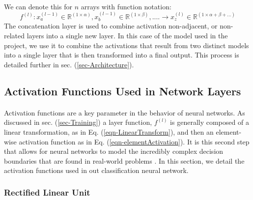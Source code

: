 \documentclass[12pt,letterpaper]{article}
\begin{document}
\paragraph*{}We can denote this for $n$ arrays with function notation:
\begin{equation}
\label{eqn-ConcatenationFunction}
f^{(l)} : x^{(l-1)}_{a} \in \mathbb{R}^{(1 \times \alpha)} , x^{(l-1)}_{b} \in \mathbb{R}^{(1 \times \beta)} , ....  \rightarrow
x^{(l)}_{z} \in \mathbb{R}^{(1 \times \alpha + \beta + ...)}
\end{equation}
The concatenation layer is used to combine activation non-adjacent, or non-related layers into a single new layer. In this case of the model used in the project, we use it to combine the activations that result from two distinct models into a single layer that is then transformed into a final output. This process is detailed further in sec. (\ref{sec-Architecture}).


\subsection{Activation Functions Used in Network Layers}
\label{sec-ActivationFunctions}

\paragraph*{}Activation functions are a key parameter in the behavior of neural networks. As discussed in sec. (\ref{sec-Training}) a layer function, $f^{(l)}$ is generally composed of a linear transformation, as in Eq. (\ref{eqn-LinearTransform}), and then an element-wise activation function as in Eq. (\ref{eqn-elementActivation}). It is this second step that allows for neural networks to model the incredibly complex decision boundaries that are found in real-world problems \cite{Geron,Loy}. In this section, we detail the activation functions used in out classification neural network. 

\subsubsection{Rectified Linear Unit}
\end{document}
